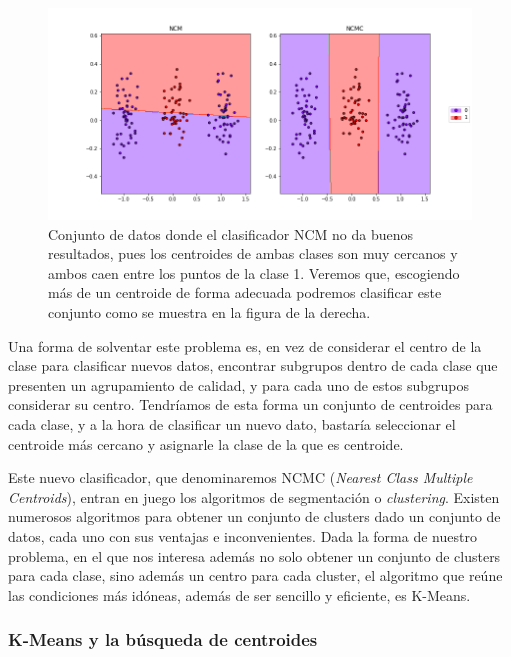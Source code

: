 \begin{figure}[h]
    \centering
    \includegraphics[width=1.0\textwidth]{images/ncm_problem.png}
    \caption{Conjunto de datos donde el clasificador NCM no da buenos resultados, pues los centroides de ambas clases son muy cercanos y ambos caen entre los puntos de la clase 1. Veremos que, escogiendo más de un centroide de forma adecuada podremos clasificar este conjunto como se muestra en la figura de la derecha.} \label{fig:problema_ncm}
\end{figure}

Una forma de solventar este problema es, en vez de considerar el centro de la clase para clasificar nuevos datos, encontrar subgrupos dentro de cada clase que presenten un agrupamiento de calidad, y para cada uno de estos subgrupos considerar su centro. Tendríamos de esta forma un conjunto de centroides para cada clase, y a la hora de clasificar un nuevo dato, bastaría seleccionar el centroide más cercano y asignarle la clase de la que es centroide.

Este nuevo clasificador, que denominaremos NCMC (\emph{Nearest Class Multiple Centroids}), entran en juego los algoritmos de segmentación o \emph{clustering}. Existen numerosos algoritmos \cite{clustering_algorithms} para obtener un conjunto de clusters dado un conjunto de datos, cada uno con sus ventajas e inconvenientes. Dada la forma de nuestro problema, en el que nos interesa además no solo obtener un conjunto de clusters para cada clase, sino además un centro para cada cluster, el algoritmo que reúne las condiciones más idóneas, además de ser sencillo y eficiente, es K-Means.

\subsubsection{K-Means y la búsqueda de centroides}


